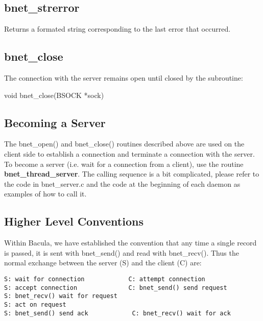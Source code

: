 \subsection*{bnet\_strerror}

Returns a formated string corresponding to the last error that occurred. 

\subsection*{bnet\_close}

The connection with the server remains open until closed by the subroutine: 

void bnet\_close(BSOCK *sock) 

\subsection*{Becoming a Server}

The bnet\_open() and bnet\_close() routines described above are used on the
client side to establish a connection and terminate a connection with the
server. To become a server (i.e. wait for a connection from a client), use the
routine {\bf bnet\_thread\_server}. The calling sequence is a bit complicated,
please refer to the code in bnet\_server.c and the code at the beginning of
each daemon as examples of how to call it. 

\subsection*{Higher Level Conventions}

Within Bacula, we have established the convention that any time a single
record is passed, it is sent with bnet\_send() and read with bnet\_recv().
Thus the normal exchange between the server (S) and the client (C) are: 

\footnotesize
\begin{verbatim}
S: wait for connection            C: attempt connection
S: accept connection              C: bnet_send() send request
S: bnet_recv() wait for request
S: act on request
S: bnet_send() send ack            C: bnet_recv() wait for ack
\end{verbatim}
\normalsize

